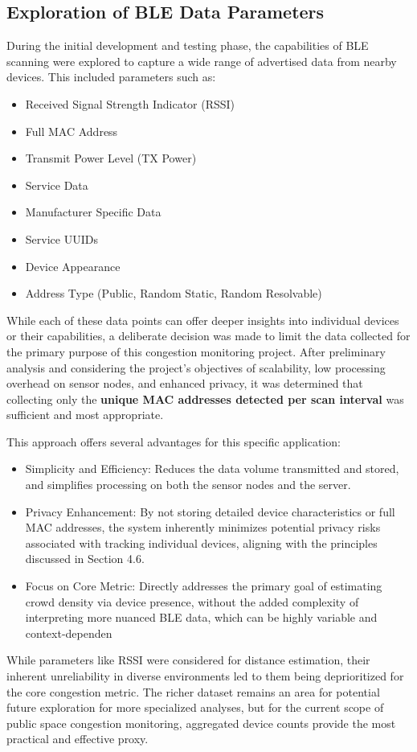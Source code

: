 \documentclass[runningheads]{llncs}
\begin{document}
\subsection{Exploration of BLE Data Parameters}
During the initial development and testing phase, the capabilities of BLE scanning were explored to capture a wide range of advertised data from nearby devices. This included parameters such as:
\begin{itemize}
    \item Received Signal Strength Indicator (RSSI)
    \item Full MAC Address
    \item Transmit Power Level (TX Power)
    \item Service Data
    \item Manufacturer Specific Data
    \item Service UUIDs
    \item Device Appearance
    \item Address Type (Public, Random Static, Random Resolvable)
\end{itemize}
While each of these data points can offer deeper insights into individual devices or their capabilities, a deliberate decision was made to limit the data collected for the primary purpose of this congestion monitoring project. After preliminary analysis and considering the project's objectives of scalability, low processing overhead on sensor nodes, and enhanced privacy, it was determined that collecting only the \textbf{unique MAC addresses detected per scan interval} was sufficient and most appropriate.

This approach offers several advantages for this specific application:
\begin{itemize}
    \item Simplicity and Efficiency: Reduces the data volume transmitted and stored, and simplifies processing on both the sensor nodes and the server.

    \item Privacy Enhancement: By not storing detailed device characteristics or full MAC addresses, the system inherently minimizes potential privacy risks associated with tracking individual devices, aligning with the principles discussed in Section 4.6.

    \item Focus on Core Metric: Directly addresses the primary goal of estimating crowd density via device presence, without the added complexity of interpreting more nuanced BLE data, which can be highly variable and context-dependen
\end{itemize}
While parameters like RSSI were considered for distance estimation, their inherent unreliability in diverse environments led to them being deprioritized for the core congestion metric. The richer dataset remains an area for potential future exploration for more specialized analyses, but for the current scope of public space congestion monitoring, aggregated device counts provide the most practical and effective proxy.
\end{document}
